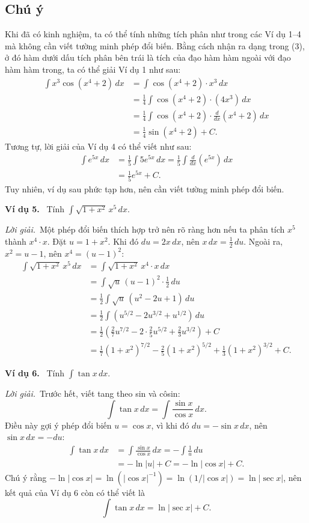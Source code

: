 \documentclass[12pt,a4paper]{article}
\newcommand{\ex}[1]{\par\medskip\noindent\textbf{Ví dụ #1.}\ }
\newcommand{\sol}{\par\nopagebreak[4]\noindent\textit{Lời giải.}\ }
\begin{document}
\subsection*{Chú ý}
Khi đã có kinh nghiệm, ta có thể tính những tích phân như trong các Ví dụ 1–4 mà không cần viết tường minh phép đổi biến. Bằng cách nhận ra dạng trong (3), ở đó hàm dưới dấu tích phân bên trái là tích của đạo hàm hàm ngoài với đạo hàm hàm trong, ta có thể giải Ví dụ 1 như sau:
\begin{align*}
\int x^3\cos(x^4+2)\,dx
&=\int\cos(x^4+2)\cdot x^3\,dx\\
&=\frac14\int\cos(x^4+2)\cdot(4x^3)\,dx\\
&=\frac14\int\cos(x^4+2)\cdot\frac{d}{dx}(x^4+2)\,dx\\
&=\frac14\sin(x^4+2)+C.
\end{align*}
Tương tự, lời giải của Ví dụ 4 có thể viết như sau:
\begin{align*}
\int e^{5x}\,dx&=\frac15\int5e^{5x}\,dx
=\frac15\int\frac{d}{dx}(e^{5x})\,dx\\
&=\frac15e^{5x}+C.
\end{align*}
Tuy nhiên, ví dụ sau phức tạp hơn, nên cần viết tường minh phép đổi biến.

\ex{5} Tính $\displaystyle\int\sqrt{1+x^2}\,x^5\,dx$.
\sol Một phép đổi biến thích hợp trở nên rõ ràng hơn nếu ta phân tích $x^5$ thành $x^4\cdot x$. Đặt $u=1+x^2$. Khi đó $du=2x\,dx$, nên $x\,dx=\frac12\,du$. Ngoài ra, $x^2=u-1$, nên $x^4=(u-1)^2$:
\begin{align*}
\int\sqrt{1+x^2}\,x^5\,dx
&=\int\sqrt{1+x^2}\,x^4\cdot x\,dx\\
&=\int\sqrt u\,(u-1)^2\cdot\frac12\,du\\
&=\frac12\int\sqrt u\,(u^2-2u+1)\,du\\
&=\frac12\int(u^{5/2}-2u^{3/2}+u^{1/2})\,du\\
&=\frac12\left(\frac27u^{7/2}-2\cdot\frac25u^{5/2}+\frac23u^{3/2}\right)+C\\
&=\frac17(1+x^2)^{7/2}-\frac25(1+x^2)^{5/2}+\frac13(1+x^2)^{3/2}+C.
\end{align*}

\ex{6} Tính $\displaystyle\int\tan x\,dx$.
\sol Trước hết, viết tang theo sin và côsin:
\[\int\tan x\,dx=\int\frac{\sin x}{\cos x}\,dx.\]
Điều này gợi ý phép đổi biến $u=\cos x$, vì khi đó $du=-\sin x\,dx$, nên $\sin x\,dx=-du$:
\begin{align*}
\int\tan x\,dx&=\int\frac{\sin x}{\cos x}\,dx=-\int\frac1u\,du\\
&=-\ln|u|+C=-\ln|\cos x|+C.
\end{align*}
Chú ý rằng $-\ln|\cos x|=\ln(|\cos x|^{-1})=\ln(1/|\cos x|)=\ln|\sec x|$, nên kết quả của Ví dụ 6 còn có thể viết là
\begin{equation}\int\tan x\,dx=\ln|\sec x|+C.\tag{5}\end{equation}
\end{document}
